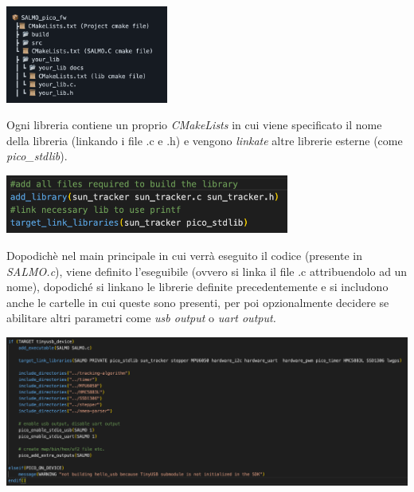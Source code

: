 \begin{center}
\includegraphics[width=0.4\textwidth]{figures/image73.png}
\captionsetup{type=figure}
\end{center}

\noindent Ogni libreria contiene un proprio \textit{CMakeLists} in cui viene specificato il
nome della libreria (linkando i file .c e .h) e vengono \textit{linkate} altre librerie
esterne (come \emph{pico\_stdlib}).

\begin{center}
\includegraphics[width=0.7\textwidth]{figures/image45.png}
\captionsetup{type=figure}
\end{center}

\noindent Dopodichè nel main principale in cui verrà eseguito il codice (presente
in \emph{SALMO.c}), viene definito l'eseguibile (ovvero si linka il file
.c attribuendolo ad un nome), dopodiché si linkano le librerie definite
precedentemente e si includono anche le cartelle in cui queste sono
presenti, per poi opzionalmente decidere se abilitare altri parametri
come \emph{usb output} o \emph{uart output.}

\begin{center}
\includegraphics[scale=0.45]{figures/image66.png}
\captionsetup{type=figure}
\end{center}

